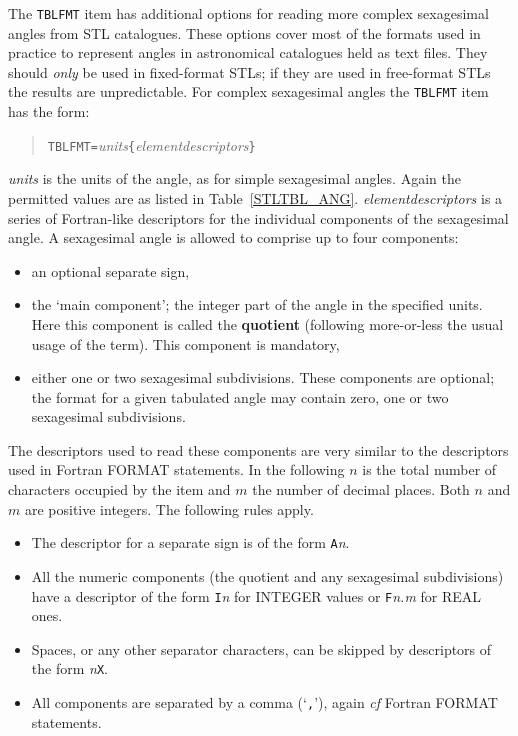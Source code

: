 \documentclass[twoside,11pt]{article}
\renewcommand{\_}{\texttt{\symbol{95}}}
\begin{document}
The {\tt TBLFMT} item has additional options for reading more complex
sexagesimal angles from STL catalogues.  These options cover most of the
formats used in practice to represent angles in astronomical catalogues
held as text files.  They should {\it only}\/ be used in fixed-format
STLs; if they are used in free-format STLs the results are
unpredictable.  For complex sexagesimal angles the {\tt TBLFMT} item
has the form:

\begin{quote}
{\tt TBLFMT=}{\it units}\/{\tt \{}{\it element\_descriptors}\/{\tt \}}
\end{quote}

{\it units}\/ is the units of the angle, as for simple sexagesimal
angles.  Again the permitted values are as listed in
Table~\ref{STLTBL_ANG}.  {\it element\_descriptors}\/ is a series of
Fortran-like descriptors for the individual components of the
sexagesimal angle.  A sexagesimal angle is allowed to comprise up
to four components:

\begin{itemize}

  \item an optional separate sign,

  \item the `main component'; the integer part of the angle in the
   specified units.  Here this component is called the {\bf quotient}
   (following more-or-less the usual usage of the term).  This
   component is mandatory,

  \item either one or two sexagesimal subdivisions.  These components
   are optional; the format for a given tabulated angle may contain
   zero, one or two sexagesimal subdivisions.

\end{itemize}

The descriptors used to read these components are very similar to
the descriptors used in Fortran FORMAT statements.  In the following
$n$\/ is the total number of characters occupied by the item and
$m$\/ the number of decimal places.  Both $n$\/ and $m$\/ are
positive integers.  The following rules apply.

\begin{itemize}

  \item The descriptor for a separate sign is of the form
   {\tt A}{\it n}.

  \item All the numeric components (the quotient and any sexagesimal
   subdivisions) have a descriptor of the form {\tt I}{\it n}\/ for
   INTEGER values or {\tt F}{\it n.m}\/ for REAL ones.

  \item Spaces, or any other separator characters, can be skipped by
   descriptors of the form {\it n}\/{\tt X}.

  \item All components are separated by a comma (`{\tt ,}'), again
   {\it cf}\/ Fortran FORMAT statements.

\end{itemize}
\end{document}
